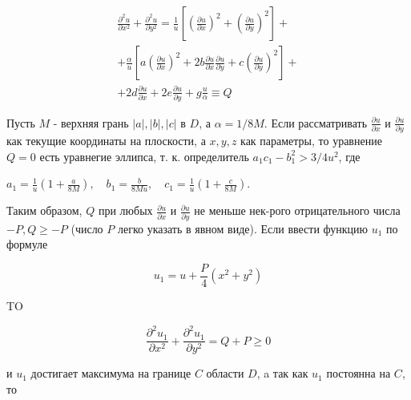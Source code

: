 \documentclass[10pt]{article}
\begin{document}
\[

\begin{gathered}

\frac{\partial^{2} u}{\partial x^{2}}+\frac{\partial^{2} u}{\partial y^{2}}=\frac{1}{u}\left[\left(\frac{\partial u}{\partial x}\right)^{2}+\left(\frac{\partial u}{\partial y}\right)^{2}\right]+ \\

+\frac{\alpha}{u}\left[a\left(\frac{\partial u}{\partial x}\right)^{2}+2 b \frac{\partial u}{\partial x} \frac{\partial u}{\partial y}+c\left(\frac{\partial u}{\partial y}\right)^{2}\right]+ \\

+2 d \frac{\partial u}{\partial x}+2 e \frac{\partial u}{\partial y}+g \frac{u}{\alpha} \equiv Q

\end{gathered}

\]



Пусть $M$ - верхняя грань $|a|,|b|,|c|$ в $D$, а $\alpha=1 / 8 M$. Если рассматривать $\frac{\partial u}{\partial x}$ и $\frac{\partial u}{\partial y}$ как текущие координаты на плоскости, а $x, y, z$ как параметры, то уравнение $Q=0$ есть уравнегие эллипса, т. к. определитель $a_{1} c_{1}-b_{1}^{2}>3 / 4 u^{2}$, где



$a_{1}=\frac{1}{u}\left(1+\frac{a}{8 M}\right), \quad b_{1}=\frac{b}{8 M u}, \quad c_{1}=\frac{1}{u}\left(1+\frac{c}{8 M}\right)$.



Таким образом, $Q$ при любых $\frac{\partial u}{\partial x}$ и $\frac{\partial u}{\partial y}$ не меньше нек-рого отрицательного числа $-P, Q \geqslant-P$ (число $P$ легко указать в явном виде). Если ввести функцию $u_{1}$ по формуле



\[

u_{1}=u+\frac{P}{4}\left(x^{2}+y^{2}\right)

\]



TO



\[

\frac{\partial^{2} u_{1}}{\partial x^{2}}+\frac{\partial^{2} u_{1}}{\partial y^{2}}=Q+P \geqslant 0

\]



и $u_{1}$ достигает максимума на границе $C$ области $D$, a так как $u_{1}$ постоянна на $C$, то
\end{document}
